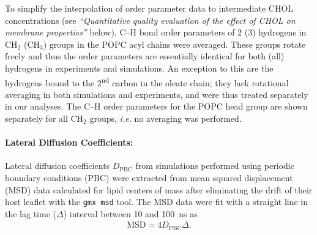 \documentclass[journal=jctcce]{achemso}
\begin{document}
To simplify the interpolation of order parameter data to intermediate CHOL concentrations (see \textit{``Quantitative quality evaluation of the effect of CHOL on membrane properties''} below), C--H bond order parameters of 2 (3) hydrogens in CH$_2$ (CH$_3$) groups in the POPC acyl chains were averaged. These groups rotate freely and thus the order parameters are essentially identical for both (all) hydrogens in experiments and simulations. An exception to this are the hydrogens bound to the 2\textsuperscript{nd} carbon in the oleate chain; they lack rotational averaging in both simulations and experiments, and were thus treated separately in our analyses. The C--H order parameters for the POPC head group are shown separately for all CH$_2$ groups, \textit{i.e.} no averaging was performed. 

\paragraph{Lateral Diffusion Coefficients:} Lateral diffusion coefficients $D_\mathrm{PBC}$ from simulations performed using periodic boundary conditions (PBC) were extracted from mean squared displacement (MSD) data calculated for lipid centers of mass after eliminating the drift of their host leaflet with the \texttt{gmx msd} tool. The MSD data were fit with a straight line in the lag time ($\Delta$) interval between 10 and 100~ns as
%
\begin{align}
	\mathrm{MSD}=4D_\mathrm{PBC}\Delta.
\end{align}
\end{document}
